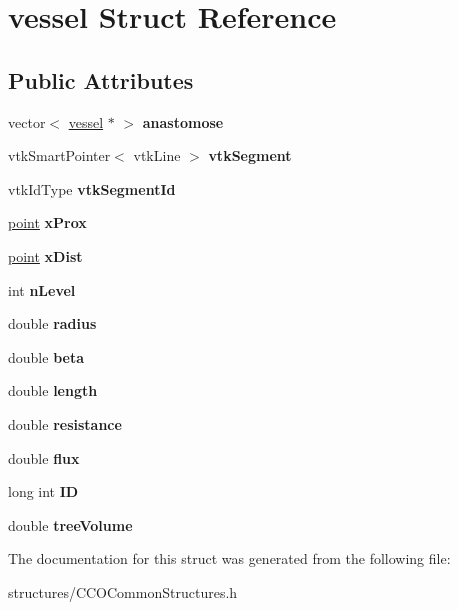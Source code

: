 \hypertarget{structvessel}{}\section{vessel Struct Reference}
\label{structvessel}
\subsection*{Public Attributes}
\begin{DoxyCompactItemize}
\item 
\mbox{\label{structvessel_a621be11a4aabcc07863d07943060489e}} 
vector$<$ \mbox{\hyperlink{structvessel}{vessel}} $\ast$ $>$ {\bfseries anastomose}
\item 
\mbox{\label{structvessel_a94ada1fa10871eef938547df1267d66e}} 
vtk\+Smart\+Pointer$<$ vtk\+Line $>$ {\bfseries vtk\+Segment}
\item 
\mbox{\label{structvessel_a5a44bb20222578bb67bf051164db7aad}} 
vtk\+Id\+Type {\bfseries vtk\+Segment\+Id}
\item 
\mbox{\label{structvessel_adc62693cc81142b471ec2aa525ba3bf5}} 
\mbox{\hyperlink{structpoint}{point}} {\bfseries x\+Prox}
\item 
\mbox{\label{structvessel_a0e84e9c1ccb9da3aea7145d63e803a30}} 
\mbox{\hyperlink{structpoint}{point}} {\bfseries x\+Dist}
\item 
\mbox{\label{structvessel_a40fb8bafbcd5654dc9bb48d49c97623a}} 
int {\bfseries n\+Level}
\item 
\mbox{\label{structvessel_a9bbe9528519d0df7931d2d3665ba45a6}} 
double {\bfseries radius}
\item 
\mbox{\label{structvessel_a46380f25d12bee7300dfa5ad38ba9b38}} 
double {\bfseries beta}
\item 
\mbox{\label{structvessel_a1336113e8af54e746e2b57ea4b4055d2}} 
double {\bfseries length}
\item 
\mbox{\label{structvessel_a86ef98b7df955a65573227a3cde46caf}} 
double {\bfseries resistance}
\item 
\mbox{\label{structvessel_a48f09ecdb7e15a0194a76a83c540c55a}} 
double {\bfseries flux}
\item 
\mbox{\label{structvessel_a7f8917c9271c49f09d35f6d909ad313a}} 
long int {\bfseries ID}
\item 
\mbox{\label{structvessel_af3b90f07ee76daa83102037ce22a1b9e}} 
double {\bfseries tree\+Volume}
\end{DoxyCompactItemize}


The documentation for this struct was generated from the following file\+:\begin{DoxyCompactItemize}
\item 
structures/C\+C\+O\+Common\+Structures.\+h\end{DoxyCompactItemize}
